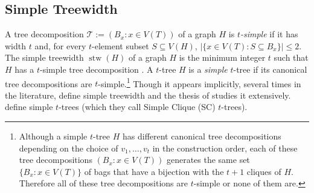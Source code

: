 \documentclass[kpfonts]{patmorin}
\DeclareMathOperator{\stw}{stw}
\theoremstyle{named}
\begin{document}
%

\subsection{Simple Treewidth}


A tree decomposition $\mathcal{T}:=(B_x:x\in V(T))$ of a graph $H$ is \emph{$t$-simple} if it has width $t$ and, for every $t$-element subset $S\subseteq V(H)$, $|\{x\in V(T):S\subseteq B_x\}|\le 2$.  The simple treewidth $\stw(H)$ of a graph $H$ is the minimum integer $t$ such that $H$ has a $t$-simple tree decomposition \cite{knauer.ueckerdt:simple}.  A $t$-tree $H$ is a \emph{simple} $t$-tree if its canonical tree decompositions are $t$-simple.\footnote{Although a simple $t$-tree $H$ has different canonical tree decompositions depending on the choice of $v_1,\ldots,v_t$ in the construction order, each of these tree decompositions $(B_x:x\in V(T))$ generates the same set $\{B_x:x\in V(T)\}$ of bags that have a bijection with the $t+1$ cliques of $H$.  Therefore all of these tree decompositions are $t$-simple or none of them are.}  Though it appears implicitly, several times in the literature, \citet{knauer.ueckerdt:simple} define simple treewidth and the thesis of \citet{wulf:stacked} studies it extensively. \citet{markenzon.justel.ea:subclasses} define simple $t$-trees (which they call Simple Clique (SC) $t$-trees).
\end{document}

